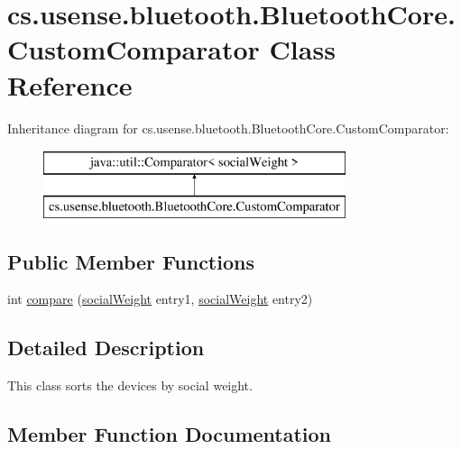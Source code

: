 \hypertarget{classcs_1_1usense_1_1bluetooth_1_1_bluetooth_core_1_1_custom_comparator}{}\section{cs.\+usense.\+bluetooth.\+Bluetooth\+Core.\+Custom\+Comparator Class Reference}
\label{classcs_1_1usense_1_1bluetooth_1_1_bluetooth_core_1_1_custom_comparator}
Inheritance diagram for cs.\+usense.\+bluetooth.\+Bluetooth\+Core.\+Custom\+Comparator\+:\begin{figure}[H]
\begin{center}
\leavevmode
\includegraphics[height=2.000000cm]{classcs_1_1usense_1_1bluetooth_1_1_bluetooth_core_1_1_custom_comparator}
\end{center}
\end{figure}
\subsection*{Public Member Functions}
\begin{DoxyCompactItemize}
\item 
int \hyperlink{classcs_1_1usense_1_1bluetooth_1_1_bluetooth_core_1_1_custom_comparator_a451319d452611343f508e4535ab6ce03}{compare} (\hyperlink{classcs_1_1usense_1_1bluetooth_1_1_bluetooth_core_1_1social_weight}{social\+Weight} entry1, \hyperlink{classcs_1_1usense_1_1bluetooth_1_1_bluetooth_core_1_1social_weight}{social\+Weight} entry2)
\end{DoxyCompactItemize}


\subsection{Detailed Description}
This class sorts the devices by social weight. 

\subsection{Member Function Documentation}
\hypertarget{classcs_1_1usense_1_1bluetooth_1_1_bluetooth_core_1_1_custom_comparator_a451319d452611343f508e4535ab6ce03}{}
